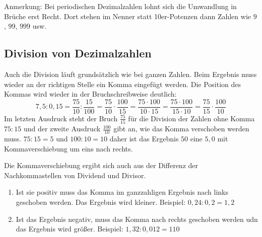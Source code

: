 Anmerkung: Bei periodischen Dezimalzahlen lohnt sich die Umwandlung in Brüche erst Recht. Dort stehen im Nenner statt 10er-Potenzen dann Zahlen wie $9$, $99$, $999$ usw.



\subsection{Division von Dezimalzahlen}\vspace{-1em}
Auch die Division läuft grundsätzlich wie bei ganzen Zahlen. Beim Ergebnis muss wieder an der richtigen Stelle ein Komma eingefügt werden. Die Position des Kommas wird wieder in der Bruchschreibweise deutlich:
\begin{equation*}
	7{,}5:0{,}15 = \frac{75}{10}: \frac{15}{100} = \frac{75}{10}\cdot \frac{100}{15} = \frac{75\cdot 100}{10\cdot 15} =\frac{75\cdot 100}{15\cdot 10} = \frac{75}{15}\cdot \frac{100}{10}
\end{equation*}
Im letzten Ausdruck steht der Bruch $\frac{75}{15}$ für die Division der Zahlen ohne Komma $75:15$ und der zweite Ausdruck $\frac{100}{10}$ gibt an, wie das Komma verschoben werden muss. $75:15=5$ und $100:10=10$ daher ist das Ergebnis $50$ eine $5{,}0$ mit Kommaverschiebung um eins nach rechts.

Die Kommaverschiebung ergibt sich auch aus der Differenz der Nachkommastellen von Dividend und Divisor. 
\begin{enumerate}
	\item Ist sie positiv muss das Komma im ganzzahligen Ergebnis nach links geschoben werden. Das Ergebnis wird kleiner. 
	Beispiel: $0{,}24:0{,}2 =1{,}2$
	
	\item Ist das Ergebnis negativ, muss das Komma nach rechts geschoben werden udn das Ergebnis wird größer. 
	Beispiel: $1{,}32:0{,}012=110$
\end{enumerate}